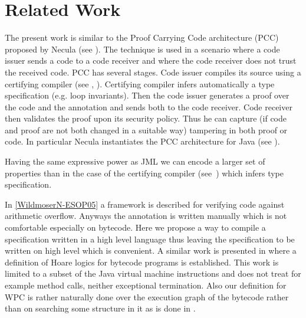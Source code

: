 \section{Related Work} \label{relWork}
The present work is similar to the Proof Carrying Code architecture (PCC) proposed by Necula (see \cite{Necula97}). The technique is used in a scenario where a code issuer sends a code to a code receiver and where the code receiver does not trust the received code. PCC has several stages. Code issuer compiles its source using a certifying compiler (see \cite{ComNec}, \cite{DesNecLee98}). Certifying compiler infers automatically a type specification (e.g. loop invariants). Then the code issuer generates a proof over the code and the annotation and sends both to the code receiver. Code receiver then validates the proof upon its security policy. Thus he can capture (if code and proof are not both changed in a suitable way) tampering in both proof or code. In particular Necula instantiates the PCC architecture for Java (see \cite{ProColLeeNec}).  

 Having the same expressive power as JML we can encode a larger set of properties than in the case of the certifying compiler (see~\cite{DesNecLee98}) which infers type specification.

In \ref{WildmoserN-ESOP05} a  framework is described for verifying code against arithmetic overflow. Anyways the annotation is written manually which is not comfortable especially on bytecode. Here we propose a way to compile a specification written in a high level language thus leaving the specification to be written on high level which is convenient.%
A similar work is presented in \cite{Quigley} where a definition of Hoare logics for bytecode programs is established. This work is limited to a subset of the Java virtual machine instructions and does not treat for example method calls, neither exceptional termination. Also our definition for WPC is rather naturally done over the execution graph of the bytecode rather than on searching some structure in it as is done in \cite{Quigley}.
